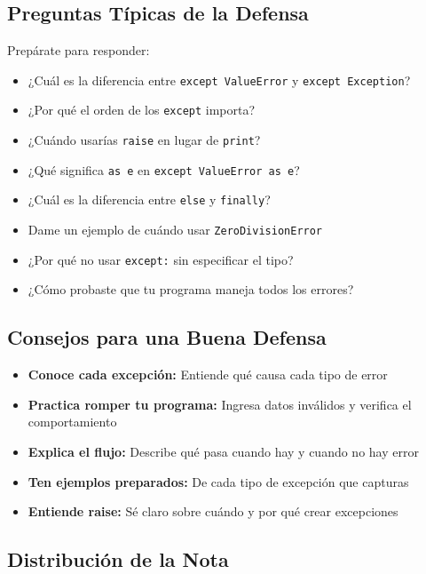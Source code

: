 \documentclass[12pt,a4paper]{article}
\begin{document}
\subsection{Preguntas Típicas de la Defensa}

Prepárate para responder:

\begin{itemize}[leftmargin=*]
    \item ¿Cuál es la diferencia entre \texttt{except ValueError} y \texttt{except Exception}?
    \item ¿Por qué el orden de los \texttt{except} importa?
    \item ¿Cuándo usarías \texttt{raise} en lugar de \texttt{print}?
    \item ¿Qué significa \texttt{as e} en \texttt{except ValueError as e}?
    \item ¿Cuál es la diferencia entre \texttt{else} y \texttt{finally}?
    \item Dame un ejemplo de cuándo usar \texttt{ZeroDivisionError}
    \item ¿Por qué no usar \texttt{except:} sin especificar el tipo?
    \item ¿Cómo probaste que tu programa maneja todos los errores?
\end{itemize}

\subsection{Consejos para una Buena Defensa}

\begin{itemize}[leftmargin=*]
    \item \textbf{Conoce cada excepción:} Entiende qué causa cada tipo de error
    \item \textbf{Practica romper tu programa:} Ingresa datos inválidos y verifica el comportamiento
    \item \textbf{Explica el flujo:} Describe qué pasa cuando hay y cuando no hay error
    \item \textbf{Ten ejemplos preparados:} De cada tipo de excepción que capturas
    \item \textbf{Entiende raise:} Sé claro sobre cuándo y por qué crear excepciones
\end{itemize}

\subsection{Distribución de la Nota}
\end{document}
